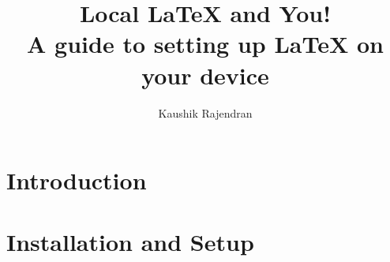 \documentclass[titlepage]{article}
\title{\textbf{Local \LaTeX{} and You!} \\ A guide to setting up \LaTeX{} on your device}
\author{Kaushik Rajendran}
\begin{document}
\maketitle
\tableofcontents
\newpage

\section{Introduction}

\clearpage

\section{Installation and Setup}

\clearpage
\end{document}
